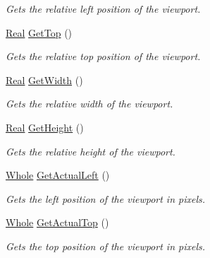 \begin{DoxyCompactItemize}
\begin{DoxyCompactList}\small\item\em Gets the relative left position of the viewport. \item\end{DoxyCompactList}\item 
\hyperlink{namespacephys_af7eb897198d265b8e868f45240230d5f}{Real} \hyperlink{classphys_1_1Viewport_af5d0413ab59dcd7bd428d73762a239e4}{GetTop} ()
\begin{DoxyCompactList}\small\item\em Gets the relative top position of the viewport. \item\end{DoxyCompactList}\item 
\hyperlink{namespacephys_af7eb897198d265b8e868f45240230d5f}{Real} \hyperlink{classphys_1_1Viewport_af6df304a6b33f34134b29a61deb98e55}{GetWidth} ()
\begin{DoxyCompactList}\small\item\em Gets the relative width of the viewport. \item\end{DoxyCompactList}\item 
\hyperlink{namespacephys_af7eb897198d265b8e868f45240230d5f}{Real} \hyperlink{classphys_1_1Viewport_ae1a6473f3ccdac16535f985453caf691}{GetHeight} ()
\begin{DoxyCompactList}\small\item\em Gets the relative height of the viewport. \item\end{DoxyCompactList}\item 
\hyperlink{namespacephys_a460f6bc24c8dd347b05e0366ae34f34a}{Whole} \hyperlink{classphys_1_1Viewport_ad0390466fc2980e8469ddcbed66900ca}{GetActualLeft} ()
\begin{DoxyCompactList}\small\item\em Gets the left position of the viewport in pixels. \item\end{DoxyCompactList}\item 
\hyperlink{namespacephys_a460f6bc24c8dd347b05e0366ae34f34a}{Whole} \hyperlink{classphys_1_1Viewport_a1eff4fac830986548cb94123b6b31898}{GetActualTop} ()
\begin{DoxyCompactList}\small\item\em Gets the top position of the viewport in pixels. \item\end{DoxyCompactList}\item 

\end{DoxyCompactItemize}
